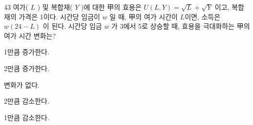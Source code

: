 \begin{question}{43}
여가( $L$ ) 및 복합재( $Y$ )에 대한 甲의 효용은 $U(L,Y)=\sqrt{L}+\sqrt{Y}$ 이고, 복합재의 가격은 1이다. 시간당 임금이 $w$ 일 때, 甲의 여가 시간이 $L$이면, 소득은 $w(24-L)$ 이 된다. 시간당 임금 $w$ 가 3에서 5로 상승할 때, 효용을 극대화하는 甲의 여가 시간 변화는?
\begin{choices}
  \item 1만큼 증가한다.
  \item 2만큼 증가한다.
  \item 변화가 없다.
  \item 2만큼 감소한다.
  \item 1만큼 감소한다.
\end{choices}
\end{question}
